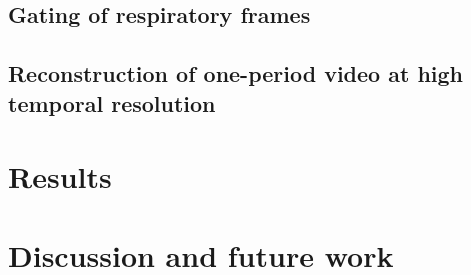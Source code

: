 \documentclass[runningheads,a4paper]{llncs}
\begin{document}
\subsection{Gating of respiratory frames}
\label{sec:method:gating}
%

%
\subsection{Reconstruction of one-period video at high temporal resolution}
\label{sec:method:super_resolution}
%

\section{Results}
\label{sec:results}
%

%
\section{Discussion and future work}
\label{sec:discussion}
%


%


\end{document}
